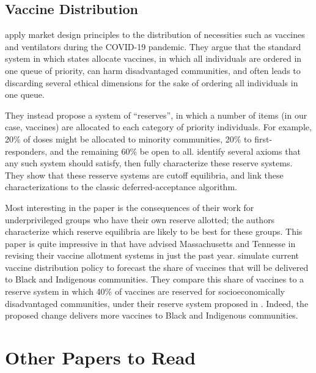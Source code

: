 \documentclass[JEL]{AEA}
\begin{document}
\subsection{Vaccine Distribution}

\cite{pathak-2020} apply market design principles to the distribution of necessities such as vaccines and ventilators during the COVID-19 pandemic. They argue that the standard system in which states allocate vaccines, in which all individuals are ordered in one queue of priority, can harm disadvantaged communities, and often leads to discarding several ethical dimensions for the sake of ordering all individuals in one queue.

They instead propose a system of ``reserves'', in which a number of items (in our case, vaccines) are allocated to each category of priority individuals. For example, 20\% of doses might be allocated to minority communities, 20\% to first-responders, and the remaining 60\% be open to all. \cite{pathak-2020}  identify several axioms that any such system should satisfy, then fully characterize these reserve systems. They show that these resserve systems are cutoff equilibria, and link these characterizations to the classic deferred-acceptance algorithm. 

Most interesting in the paper is the consequences of their work for underprivileged groups who have their own reserve allotted; the authors characterize which reserve equilibria are likely to be best for these groups. This paper is quite impressive in that \cite{pathak-2020} have advised Massachusetts and Tennesse in revising their vaccine allotment systems in just the past year. \cite{pathak-2020b} simulate current vaccine distribution policy to forecast the share of vaccines that will be delivered to Black and Indigenous communities. They compare this share of vaccines to a reserve system in which 40\% of vaccines are reserved for socioeconomically disadvantaged communities, under their reserve system proposed in \cite{pathak-2020}. Indeed, the proposed change delivers more vaccines to Black and Indigenous communities.  

\section{Other Papers to Read}
\end{document}
